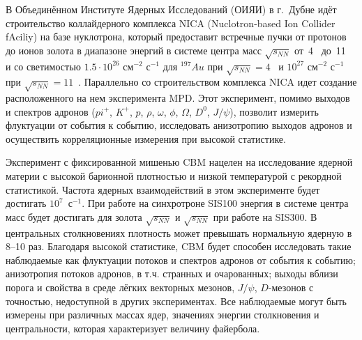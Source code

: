 
В Объединённом Институте Ядерных Исследований (ОИЯИ) в г.~Дубне идёт строительство коллайдерного комплекса NICA (Nuclotron-based Ion Collider fAciliy) на базе нуклотрона, который предоставит встречные пучки от протонов до ионов золота в диапазоне энергий в системе центра масс $\sqrt{s_{NN}}$ от~4~\GeVperNucl{} до~11~\GeVperNucl{} и со светимостью $1.5 \cdot 10^{26}$ см$^{-2}$ с$^{-1}$ для $^{197}Au$ при $\sqrt{s_{NN}}=4$~\GeVperNucl{} и $10^{27}$ см$^{-2}$ с$^{-1}$ при $\sqrt{s_{NN}}=11$~\GeVperNucl. Параллельно со строительством комплекса NICA идет создание расположенного на нем эксперимента MPD. Этот эксперимент, помимо выходов и спектров адронов ($pi^{+}$, $K^{+}$, $p$, $\rho$, $\omega$, $\phi$, $\Omega$, $D^{0}$, $J/\psi$), позволит измерить флуктуации от события к событию, исследовать анизотропию выходов адронов и осуществить корреляционные измерения при высокой статистике.

\bigskip




Эксперимент с фиксированной мишенью CBM нацелен на исследование ядерной материи с высокой барионной плотностью и низкой температурой с рекордной статистикой. Частота ядерных взаимодействий в этом эксперименте будет достигать $10^7$~с$^{-1}$. При работе на синхротроне SIS100 энергия в системе центра масс будет достигать для золота $\sqrt{s_{NN}}$ \todo и $\sqrt{s_{NN}}$ \todo при работе на SIS300. В центральных столкновениях плотность может превышать нормальную ядерную в 8--10 раз. Благодаря высокой статистике, CBM будет способен исследовать такие наблюдаемые как флуктуации потоков и спектров адронов от события к событию; анизотропия потоков адронов, в т.ч. странных и очарованных; выходы вблизи порога и свойства в среде лёгких векторных мезонов, $J/\psi$, $D$-мезонов с точностью, недоступной в других экспериментах. Все наблюдаемые могут быть измерены при различных массах ядер, значениях энергии столкновения и центральности, которая характеризует величину файербола.

\bigskip


